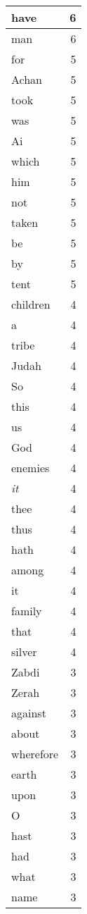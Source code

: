 \begin{center}
\begin{longtable}{l|r}
have & 6\\ \hline 
man & 6\\ \hline 
for & 5\\ \hline 
Achan & 5\\ \hline 
took & 5\\ \hline 
was & 5\\ \hline 
Ai & 5\\ \hline 
which & 5\\ \hline 
him & 5\\ \hline 
not & 5\\ \hline 
taken & 5\\ \hline 
be & 5\\ \hline 
by & 5\\ \hline 
tent & 5\\ \hline 
children & 4\\ \hline 
a & 4\\ \hline 
tribe & 4\\ \hline 
Judah & 4\\ \hline 
So & 4\\ \hline 
this & 4\\ \hline 
us & 4\\ \hline 
God & 4\\ \hline 
enemies & 4\\ \hline 
\emph{it} & 4\\ \hline 
thee & 4\\ \hline 
thus & 4\\ \hline 
hath & 4\\ \hline 
among & 4\\ \hline 
it & 4\\ \hline 
family & 4\\ \hline 
that & 4\\ \hline 
silver & 4\\ \hline 
Zabdi & 3\\ \hline 
Zerah & 3\\ \hline 
against & 3\\ \hline 
about & 3\\ \hline 
wherefore & 3\\ \hline 
earth & 3\\ \hline 
upon & 3\\ \hline 
O & 3\\ \hline 
hast & 3\\ \hline 
had & 3\\ \hline 
what & 3\\ \hline 
name & 3\\ \hline 

\end{longtable}
\end{center}
